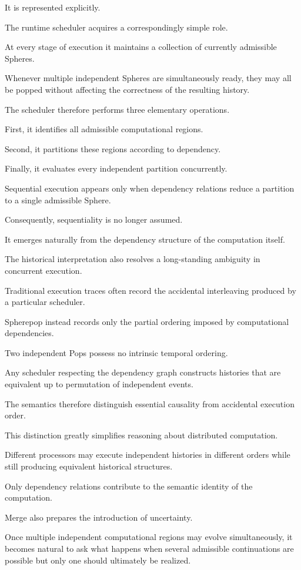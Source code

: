 \documentclass[12pt,oneside]{article}
\theoremstyle{definition}
\theoremstyle{remark}
\begin{document}
It is represented explicitly.

The runtime scheduler acquires a correspondingly simple role.

At every stage of execution it maintains a collection of currently admissible
Spheres.

Whenever multiple independent Spheres are simultaneously ready, they may all
be popped without affecting the correctness of the resulting history.

The scheduler therefore performs three elementary operations.

First, it identifies all admissible computational regions.

Second, it partitions these regions according to dependency.

Finally, it evaluates every independent partition concurrently.

Sequential execution appears only when dependency relations reduce a partition
to a single admissible Sphere.

Consequently, sequentiality is no longer assumed.

It emerges naturally from the dependency structure of the computation itself.

The historical interpretation also resolves a long-standing ambiguity in
concurrent execution.

Traditional execution traces often record the accidental interleaving produced
by a particular scheduler.

Spherepop instead records only the partial ordering imposed by computational
dependencies.

Two independent Pops possess no intrinsic temporal ordering.

Any scheduler respecting the dependency graph constructs histories that are
equivalent up to permutation of independent events.

The semantics therefore distinguish essential causality from accidental
execution order.

This distinction greatly simplifies reasoning about distributed computation.

Different processors may execute independent histories in different orders
while still producing equivalent historical structures.

Only dependency relations contribute to the semantic identity of the
computation.

Merge also prepares the introduction of uncertainty.

Once multiple independent computational regions may evolve simultaneously, it
becomes natural to ask what happens when several admissible continuations are
possible but only one should ultimately be realized.
\end{document}
